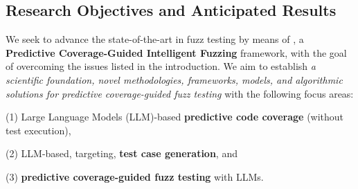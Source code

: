 \subsection{Research Objectives and Anticipated Results}



We seek to advance the state-of-the-art in fuzz testing by means of
{\tool}, a {\bf Predictive Coverage-Guided Intelligent Fuzzing}
framework, with the goal of overcoming the issues listed in the
introduction. We aim to establish {\em a scientific foundation, novel
  methodologies, frameworks, models, and algorithmic solutions for
  predictive coverage-guided fuzz testing} with the following focus
areas:



(1) Large Language Models (LLM)-based {\bf predictive code coverage} (without test execution),

(2) LLM-based, targeting, {\bf test case generation}, and

(3) {\bf predictive coverage-guided fuzz testing} with LLMs.


